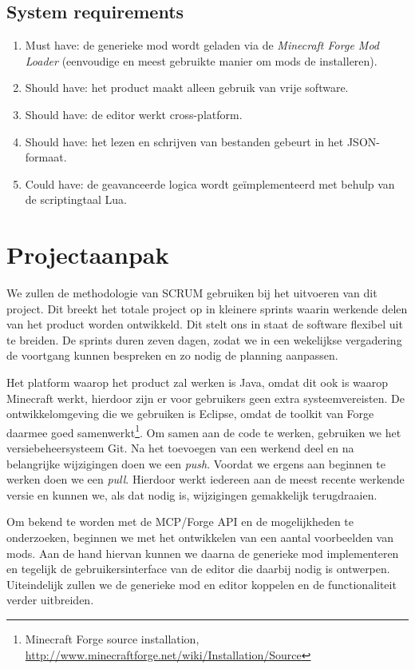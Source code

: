 \documentclass{article}
\begin{document}
	\subsection{System requirements}
	\begin{enumerate}
		\item Must have: de generieke mod wordt geladen via de \emph{Minecraft Forge Mod Loader} (eenvoudige en meest gebruikte manier om mods de installeren).
		
		\item Should have: het product maakt alleen gebruik van vrije software.
		\item Should have: de editor werkt cross-platform.
		\item Should have: het lezen en schrijven van bestanden gebeurt in het JSON-formaat.
		
		\item Could have: de geavanceerde logica wordt ge\"implementeerd met behulp van de scriptingtaal Lua.
	\end{enumerate}

\newpage

\section{Projectaanpak}
	We zullen de methodologie van SCRUM gebruiken bij het uitvoeren van dit project. Dit breekt het totale project op in kleinere sprints waarin werkende delen van het product worden ontwikkeld. Dit stelt ons in staat de software flexibel uit te breiden. De sprints duren zeven dagen, zodat we in een wekelijkse vergadering de voortgang kunnen bespreken en zo nodig de planning aanpassen.
	
	Het platform waarop het product zal werken is Java, omdat dit ook is waarop Minecraft werkt, hierdoor zijn er voor gebruikers geen extra systeemvereisten. De ontwikkelomgeving die we gebruiken is Eclipse, omdat de toolkit van Forge daarmee goed samenwerkt\footnote{Minecraft Forge source installation, \url{http://www.minecraftforge.net/wiki/Installation/Source}}. Om samen aan de code te werken, gebruiken we het versiebeheersysteem Git. Na het toevoegen van een werkend deel en na belangrijke wijzigingen doen we een \emph{push}. Voordat we ergens aan beginnen te werken doen we een \emph{pull}. Hierdoor werkt iedereen aan de meest recente werkende versie en kunnen we, als dat nodig is, wijzigingen gemakkelijk terugdraaien.
	
	Om bekend te worden met de MCP/Forge API en de mogelijkheden te onderzoeken, beginnen we met het ontwikkelen van een aantal voorbeelden van mods. Aan de hand hiervan kunnen we daarna de generieke mod implementeren en tegelijk de gebruikersinterface van de editor die daarbij nodig is ontwerpen. Uiteindelijk zullen we de generieke mod en editor koppelen en de functionaliteit verder uitbreiden.
\end{document}
